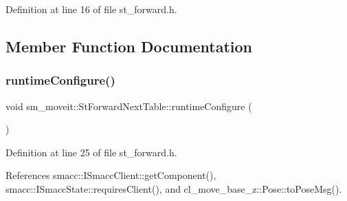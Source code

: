Definition at line 16 of file st\+\_\+forward.\+h.



\subsection{Member Function Documentation}
\mbox{\label{structsm__moveit_1_1StForwardNextTable_a4f6c466efdb91b0eb9aaee71f87a4fc4}} 
\subsubsection{\texorpdfstring{runtime\+Configure()}{runtimeConfigure()}}
{\footnotesize\ttfamily void sm\+\_\+moveit\+::\+St\+Forward\+Next\+Table\+::runtime\+Configure (\begin{DoxyParamCaption}{ }\end{DoxyParamCaption})\hspace{0.3cm}{\ttfamily [inline]}}



Definition at line 25 of file st\+\_\+forward.\+h.



References smacc\+::\+I\+Smacc\+Client\+::get\+Component(), smacc\+::\+I\+Smacc\+State\+::requires\+Client(), and cl\+\_\+move\+\_\+base\+\_\+z\+::\+Pose\+::to\+Pose\+Msg().


